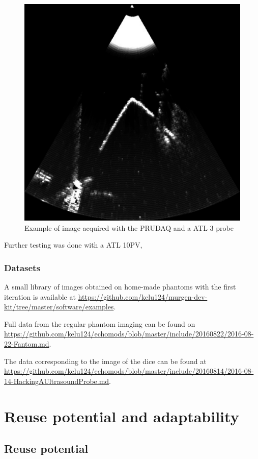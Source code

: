 \documentclass[letterpaper, 10 pt, conference]{ieeeconf} %
\begin{document}
\begin{figure}%
\centering
\includegraphics[width=.8\linewidth]{sonde3V}
\caption{Example of image acquired with the PRUDAQ and a ATL 3 probe}
\label{fig:retroATL}
\end{figure}

Further testing was done with a ATL 10PV, 

\subsubsection{Datasets}

A small library of images obtained on home-made phantoms with the first iteration is available at \url{https://github.com/kelu124/murgen-dev-kit/tree/master/software/examples}.

Full data from the regular phantom imaging can be found on \url{https://github.com/kelu124/echomods/blob/master/include/20160822/2016-08-22-Fantom.md}.

The data corresponding to the image of the dice can be found at \url{https://github.com/kelu124/echomods/blob/master/include/20160814/2016-08-14-HackingAUltrasoundProbe.md}. 


\section{Reuse potential and adaptability} 

\subsection{Reuse potential}
\end{document}
